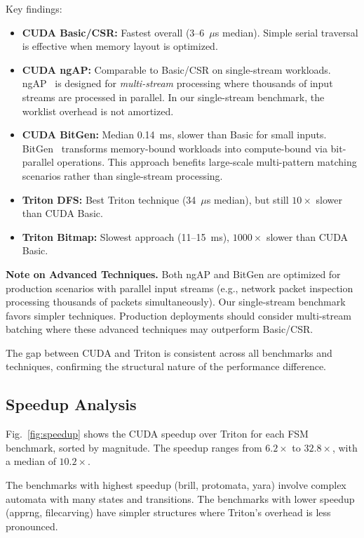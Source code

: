 Key findings:
\begin{itemize}
    \item \textbf{CUDA Basic/CSR:} Fastest overall (3--6~$\mu$s median). Simple serial traversal is effective when memory layout is optimized.
    \item \textbf{CUDA ngAP:} Comparable to Basic/CSR on single-stream workloads. ngAP~\cite{ngap} is designed for \emph{multi-stream} processing where thousands of input streams are processed in parallel. In our single-stream benchmark, the worklist overhead is not amortized.
    \item \textbf{CUDA BitGen:} Median 0.14~ms, slower than Basic for small inputs. BitGen~\cite{bitgen} transforms memory-bound workloads into compute-bound via bit-parallel operations. This approach benefits large-scale multi-pattern matching scenarios rather than single-stream processing.
    \item \textbf{Triton DFS:} Best Triton technique (34~$\mu$s median), but still $10\times$ slower than CUDA Basic.
    \item \textbf{Triton Bitmap:} Slowest approach (11--15~ms), $1000\times$ slower than CUDA Basic.
\end{itemize}

\textbf{Note on Advanced Techniques.} Both ngAP and BitGen are optimized for production scenarios with parallel input streams (e.g., network packet inspection processing thousands of packets simultaneously). Our single-stream benchmark favors simpler techniques. Production deployments should consider multi-stream batching where these advanced techniques may outperform Basic/CSR.

The gap between CUDA and Triton is consistent across all benchmarks and techniques, confirming the structural nature of the performance difference.

\subsection{Speedup Analysis}

Fig.~\ref{fig:speedup} shows the CUDA speedup over Triton for each FSM benchmark, sorted by magnitude. The speedup ranges from $6.2\times$ to $32.8\times$, with a median of $10.2\times$.

The benchmarks with highest speedup (brill, protomata, yara) involve complex automata with many states and transitions. The benchmarks with lower speedup (apprng, filecarving) have simpler structures where Triton's overhead is less pronounced.

